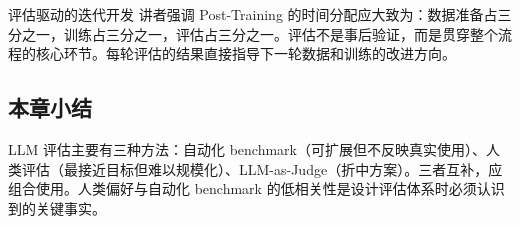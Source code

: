\begin{knowledgebox}{评估驱动的迭代开发}
讲者强调 Post-Training 的时间分配应大致为：数据准备占三分之一，训练占三分之一，评估占三分之一。评估不是事后验证，而是贯穿整个流程的核心环节。每轮评估的结果直接指导下一轮数据和训练的改进方向。
\end{knowledgebox}

\subsection{本章小结}

LLM 评估主要有三种方法：自动化 benchmark（可扩展但不反映真实使用）、人类评估（最接近目标但难以规模化）、LLM-as-Judge（折中方案）。三者互补，应组合使用。人类偏好与自动化 benchmark 的低相关性是设计评估体系时必须认识到的关键事实。

\newpage
